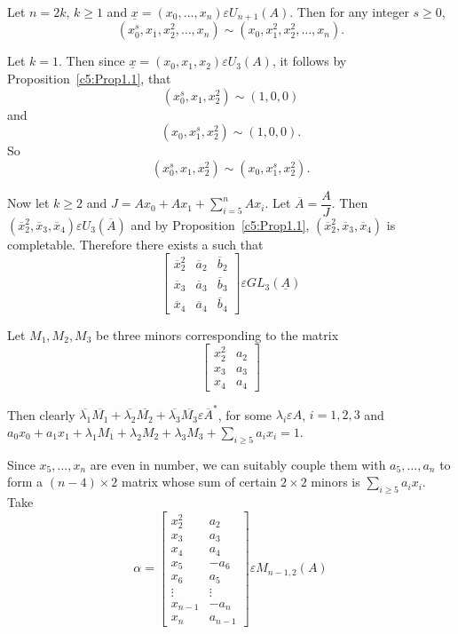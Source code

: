 \begin{coro}\label{c5:coro2.5}
Let $n=2k$, $k\geq 1$ and $\underline{x}=(x_0,\ldots,x_n)\varepsilon
U_{n+1}(A)$. Then for any integer $s\geq 0$, 
$$
\left(x^{s}_0,x_1,x^{2}_2,\ldots,x_n\right)\sim\left(x_0,x^{2}_1,x^{2}_2,\ldots,x_n\right).
$$
\end{coro}

\begin{Proof}
Let $k=1$. Then since $\underline{x}=(x_0,x_1,x_2)\varepsilon U_3(A)$,
it follows by Proposition~\ref{c5:Prop1.1}, that 
$$
\left(x^{s}_0,x_1,x^{2}_2\right)\sim (1,0,0)
$$
and
$$
\left(x_0,x^{s}_1,x^{2}_2\right)\sim(1,0,0).
$$
So
$$
\left(x^{s}_0,x_1,x^{2}_2\right)\sim\left(x_0,x^{s}_1,x^{2}_2\right).
$$

Now let $k\geq 2$ and $J=Ax_0+Ax_1+\sum\limits_{i=5}^{n}Ax_i$. Let
$\overline{A}=\dfrac{A}{J}$. Then
$\left(\overline{x}^{2}_2,\overline{x}_3,\overline{x}_4\right)\varepsilon
U_3(\overline{A})$ and by Proposition~\ref{c5:Prop1.1},
$\left(\overline{x}^{2}_2,\overline{x}_3,\overline{x}_4\right)$ is
completable. Therefore there exists a such that 
$$
\begin{bmatrix}
\overline{x}^{2}_2 & \overline{a}_2 & \overline{b}_2\\
\overline{x}_3 & \overline{a}_3 & \overline{b}_3\\
\overline{x}_4 & \overline{a}_4 & \overline{b}_4
\end{bmatrix} \varepsilon GL_3(\underline{A})
$$

Let $M_1,M_2,M_3$ be three minors corresponding to the matrix
$$
\begin{bmatrix}
x^{2}_2 & a_2\\
x_3 &  a_3\\
x_4 & a_4
\end{bmatrix}
$$

Then clearly $\overline{\lambda_1}\overline{{M}_1}+\overline{\lambda_2}\overline{{M}_2}
  +\overline{\lambda_3}\overline{M_3}\varepsilon
  \overline{A}^{\ast}$, for some $\lambda_i\varepsilon A$, $i=1,2,3$
  and
  $a_0x_0+a_1x_1+\lambda_1M_1+\lambda_2M_2+\lambda_3M_3+\sum\limits_{i\geq
  5} a_i x_i=1$. 

Since $x_5,\ldots,x_n$ are even in number, we can suitably couple them
with $a_5,\ldots, a_n$ to form a $(n-4)\times 2$ matrix whose sum of
certain $2\times 2$ minors is $\sum\limits_{i\geq 5}a_ix_i$. Take
$$
\alpha=
\begin{bmatrix}
x^{2}_2 & a_2\\
x_3 & a_3\\
x_4 & a_4\\
x_5 & -a_6\\
x_6 & a_5\\
\vdots & \vdots\\
x_{n-1} & -a_n\\
x_n & a_{n-1}
\end{bmatrix} \varepsilon M_{n-1,2}(A)
$$


\end{Proof}

